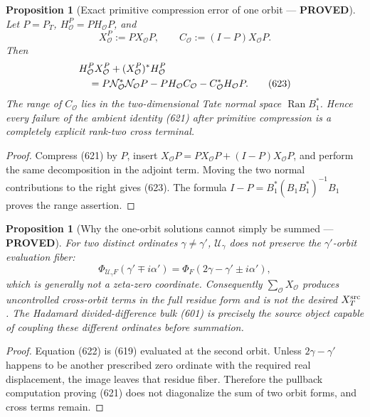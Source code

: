 \documentclass[11pt]{article}
\newtheorem{proposition}[theorem]{Proposition}
\newcommand{\PROVED}{\textcolor{green!45!black}{\textbf{PROVED}}}
\begin{document}
\begin{proposition}[Exact primitive compression error of one orbit ---
\PROVED]
Let \(P=P_T\), \(H_{\mathcal O}^P=PH_{\mathcal O}P\), and
\[
 X_{\mathcal O}^P:=PX_{\mathcal O}P,\qquad
 C_{\mathcal O}:=(I-P)X_{\mathcal O}P.
\]
Then
\begin{align}
 &H_{\mathcal O}^PX_{\mathcal O}^P+
   (X_{\mathcal O}^P)^*H_{\mathcal O}^P\notag\\
 &\quad=
 P\mathcal N_{\mathcal O}^*\mathcal N_{\mathcal O}P
 -PH_{\mathcal O}C_{\mathcal O}
 -C_{\mathcal O}^*H_{\mathcal O}P.                  \tag{623}
\end{align}
The range of \(C_{\mathcal O}\) lies in the two-dimensional Tate normal
space \(\operatorname{Ran}B_1^*\).  Hence every failure of the ambient
identity (621) after primitive compression is a completely explicit
rank-two cross terminal.
\end{proposition}

\begin{proof}
Compress (621) by \(P\), insert
\(X_{\mathcal O}P=PX_{\mathcal O}P+
(I-P)X_{\mathcal O}P\), and perform the same decomposition in the adjoint
term.  Moving the two normal contributions to the right gives (623).
The formula \(I-P=B_1^*(B_1B_1^*)^{-1}B_1\) proves the range assertion.
\end{proof}

\begin{proposition}[Why the one-orbit solutions cannot simply be summed ---
\PROVED]
For two distinct ordinates \(\gamma\ne\gamma'\),
\(\mathcal U_\gamma\) does not preserve the
\(\gamma'\)-orbit evaluation fiber:
\begin{equation}
 \Phi_{\mathcal U_\gamma F}(\gamma'\mp i\alpha')
 =\Phi_F(2\gamma-\gamma'\pm i\alpha'),               \tag{622}
\end{equation}
which is generally not a zeta-zero coordinate.  Consequently
\(\sum_{\mathcal O}X_{\mathcal O}\) produces uncontrolled cross-orbit
terms in the full residue form and is not the desired
\(X_T^{\rm src}\).  The Hadamard divided-difference bulk (601) is precisely
the source object capable of coupling these different ordinates before
summation.
\end{proposition}

\begin{proof}
Equation (622) is (619) evaluated at the second orbit.  Unless
\(2\gamma-\gamma'\) happens to be another prescribed zero ordinate with
the required real displacement, the image leaves that residue fiber.
Therefore the pullback computation proving (621) does not diagonalize the
sum of two orbit forms, and cross terms remain.
\end{proof}
\end{document}
